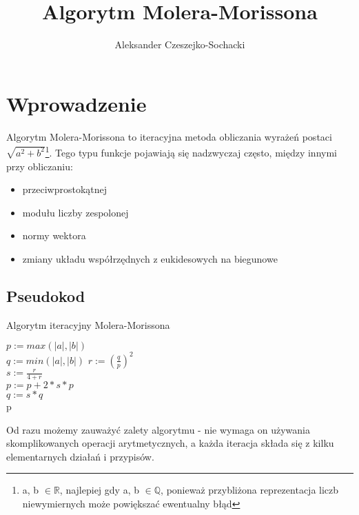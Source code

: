 \documentclass{article}
\title{Algorytm Molera-Morissona}
\author{Aleksander Czeszejko-Sochacki}
\begin{document}
    \maketitle
    \section{Wprowadzenie}
        \indent Algorytm Molera-Morissona to iteracyjna metoda obliczania 
	wyrażeń postaci $\sqrt{a^2 + b^2}$\footnote{a, b $\in\mathbb{R}$, najlepiej gdy a, b $\in\mathbb{Q}$, ponieważ przybliżona reprezentacja
	liczb niewymiernych może powiększać ewentualny błąd}. Tego typu funkcje 
        pojawiają się nadzwyczaj często, między innymi przy obliczaniu:
        \begin{itemize}
            \item przeciwprostokątnej
            \item modułu liczby zespolonej
            \item normy wektora
	    \item zmiany układu współrzędnych z eukidesowych na biegunowe
        \end{itemize}
	\par

        \subsection{Pseudokod}
            \begin{algorithm}
            \caption{Algorytm iteracyjny Molera-Morissona}
                \begin{algorithmic}
                    \STATE $p := max(|a|, |b|)$\\
                           $q := min(|a|, |b|)$
                        \STATE $r:= (\frac{q}{p})^2$\\
                               $s := \frac{r}{4 + r}$\\
                               $p := p + 2*s*p$\\
                               $q := s * q$\\
                    \ENDWHILE
                    \RETURN p

                \end{algorithmic}
            
            \end{algorithm}
	    
	    \indent Od razu możemy zauważyć zalety algorytmu - nie wymaga on używania skomplikowanych operacji arytmetycznych,
	    a każda iteracja składa się z kilku elementarnych działań i przypisów. 
        \newpage
	
\end{document}
